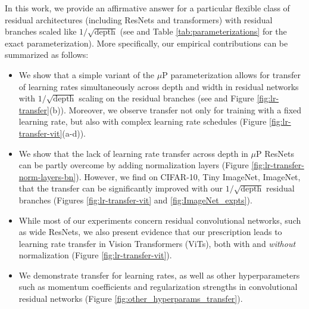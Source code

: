 \documentclass{article} %
\begin{document}
In this work, we provide an affirmative answer for a particular flexible class of residual architectures (including ResNets and transformers) with residual branches scaled like $1/\sqrt{\text{depth}}$ (see  and Table \ref{tab:parameterizations} for the exact parameterization). 
% 
% 
% 
% 
More specifically, our empirical contributions can be summarized as follows: 
% 
\begin{itemize}
\setlength\itemsep{0em}
    \item We show that a simple variant of the $\mu$P parameterization allows for transfer of learning rates simultaneously across depth and width in residual networks with $1/\sqrt{\text{depth}}$ scaling on the residual branches (see  and Figure \ref{fig:lr-transfer}(b)). Moreover, we observe transfer not only for training with a fixed learning rate, but also with complex learning rate schedules (Figure \ref{fig:lr-transfer-vit}(a-d)).
    \item {} 
      We show that the lack of learning rate transfer across depth in $\mu$P ResNets can be partly overcome by adding normalization layers (Figure \ref{fig:lr-transfer-norm-layers-bn}). However, we find on CIFAR-10, Tiny ImageNet, ImageNet, that the transfer can be significantly improved with our $1/\sqrt{\text{depth}}$ residual branches (Figures \ref{fig:lr-transfer-vit} and \ref{fig:ImageNet_expts}). 
    \item While most of our experiments concern residual convolutional networks, such as wide ResNets, we also present evidence that our prescription leads to learning rate transfer in Vision Transformers (ViTs),  both with and \emph{without} normalization
    (Figure \ref{fig:lr-transfer-vit}).
     \item We demonstrate transfer for learning rates, as well as other hyperparameters such as momentum coefficients and regularization strengths in convolutional residual networks (Figure \ref{fig:other_hyperparams_transfer}).
\end{itemize}
\end{document}
